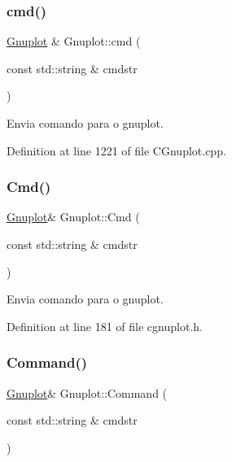 \mbox{\label{class_gnuplot_a07607803ede8dd5416906df0a1924fc5}} 
\subsubsection{\texorpdfstring{cmd()}{cmd()}}
{\footnotesize\ttfamily \hyperlink{class_gnuplot}{Gnuplot} \& Gnuplot\+::cmd (\begin{DoxyParamCaption}\item[{const std\+::string \&}]{cmdstr }\end{DoxyParamCaption})}



Envia comando para o gnuplot. 



Definition at line 1221 of file C\+Gnuplot.\+cpp.

\mbox{\label{class_gnuplot_af9ffb5b4c18cdf7c56e5c446f72e515d}} 
\subsubsection{\texorpdfstring{Cmd()}{Cmd()}}
{\footnotesize\ttfamily \hyperlink{class_gnuplot}{Gnuplot}\& Gnuplot\+::\+Cmd (\begin{DoxyParamCaption}\item[{const std\+::string \&}]{cmdstr }\end{DoxyParamCaption})\hspace{0.3cm}{\ttfamily [inline]}}



Envia comando para o gnuplot. 



Definition at line 181 of file cgnuplot.\+h.

\mbox{\label{class_gnuplot_a0d6db1521e789d7b73415ce85b723046}} 
\subsubsection{\texorpdfstring{Command()}{Command()}}
{\footnotesize\ttfamily \hyperlink{class_gnuplot}{Gnuplot}\& Gnuplot\+::\+Command (\begin{DoxyParamCaption}\item[{const std\+::string \&}]{cmdstr }\end{DoxyParamCaption})\hspace{0.3cm}{\ttfamily [inline]}}



